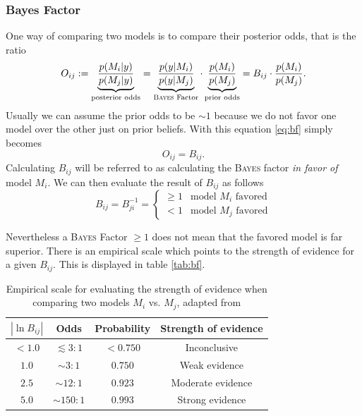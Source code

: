 \documentclass[%
 reprint,
 amsmath,amssymb,
 aps,
]{revtex4-1}
\begin{document}
\subsubsection{\textbf{Bayes Factor}}
One way of comparing two models is to compare their posterior odds, that is the ratio \cite{Trotta_2008} \begin{equation}\label{eq:bf}O_{ij}:=\underbrace{\frac{p(M_i|y)}{p(M_j|y)}}_{\text{posterior odds}}=\underbrace{\frac{p(y|M_i)}{p(y|M_j)}}_{\text{\textsc{Bayes} Factor}}\cdot\underbrace{\frac{p(M_i)}{p(M_j)}}_{\text{prior odds}}=B_{ij}\cdot\frac{p(M_i)}{p(M_j)}.\end{equation}
Usually we can assume the prior odds to be $\sim 1$ because we do not favor one model over the other just on prior beliefs. With this equation \eqref{eq:bf} simply becomes $$O_{ij}=B_{ij}.$$
Calculating $B_{ij}$ will be referred to as calculating the \textsc{Bayes} factor \emph{in favor of} model $M_i$. We can then evaluate the result of $B_{ij}$ as follows 
\begin{equation*}
	B_{ij}=B_{ji}^{-1}=\begin{cases} \geq 1 & \text{model } M_i \text{ favored}\\
	 <1 & \text{model } M_j \text{ favored}
	\end{cases}
\end{equation*}

Nevertheless a \textsc{Bayes} Factor $\geq1$ does not mean that the favored model is far superior. There is an empirical scale which points to the strength of evidence for a given $B_{ij}$. This is displayed in table \eqref{tab:bf}.


\begin{table}[htbp]

	\centering
	{\renewcommand{\arraystretch}{1.3}
	\begin{tabular}{|c|c|c|c|}
		\hline
		$|\ln B_{ij}|$& Odds & Probability & Strength of evidence \\
		\hline
		$< 1.0$& $ \lesssim 3:1$ & $< 0.750$  & Inconclusive  \\
		$1.0$ & $\sim 3:1$ & $0.750$ & Weak evidence  \\
		$2.5$& $\sim 12:1$ & $0.923$ & Moderate evidence \\
		$5.0$& $\sim 150:1$ & $0.993$ & Strong evidence \\
		\hline
	\end{tabular}}
\caption{Empirical scale for evaluating the strength of evidence when comparing two models $M_i$ vs. $M_j$, adapted from \cite{Trotta_2008}}
\label{tab:bf}
\end{table}
\end{document}
